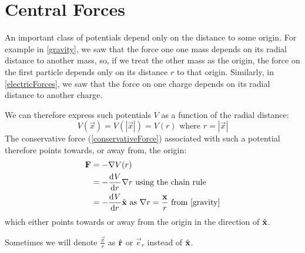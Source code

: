 \documentclass[../main.tex]{subfiles}
\begin{document}
\chapter{Central Forces}
An important class of potentials depend only on the distance to some origin.
For example in \cref{gravity}, we saw that the force one one mass depends on its radial distance to another mass, so, if we treat the other mass as the origin, the force on the first particle depends only on its distance $r$ to that origin.
Similarly, in \cref{electricForces}, we saw that the force on one charge depends on its radial distance to another charge.

We can therefore express such potentials $V$ as a function of the radial distance:
\[
  V(\vec{x}) = V(|\vec{x}|) = V(r) \text{ where $r = |\vec{x}|$}
\]
The conservative force (\cref{conservativeForce}) associated with such a potential therefore points towards, or away from, the origin:
\begin{align}
  \vec{F} &= - \nabla V(r) \nonumber \\
          &= - \deriv{V}{r} \nabla r \text{ using the chain rule} \nonumber \\
          &= - \deriv{V}{r} \uvec{x} \text{ as $\nabla r = \frac{\vec{x}}{r}$ from \cref{gravity}} \label{radialForce}
\end{align}
which either points towards or away from the origin in the direction of $\hat{\mathbf{\bm{x}}}$.
\begin{remark}[Notation]
  Sometimes we will denote $\frac{\vec{x}}{r}$ as $\hat{\mathbf{\bm{r}}}$ or $\vec{e}_r$ instead of $\hat{\mathbf{\bm{x}}}$.
\end{remark}
\end{document}
